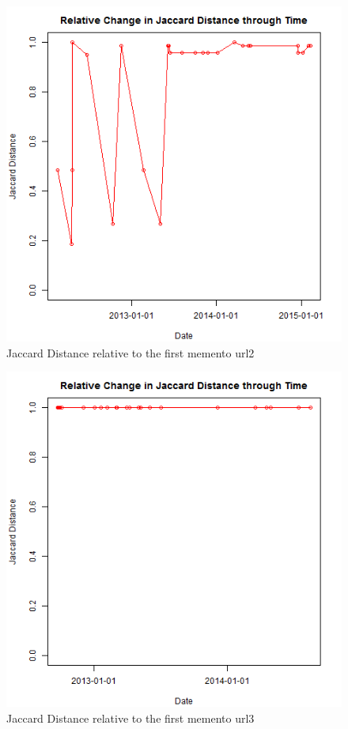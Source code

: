 \begin{figure}[ht]
	\begin{center}
		 \includegraphics[scale=0.60]{url2}
		  \caption{Jaccard Distance relative to the first memento url2}
	 \end{center}
\end{figure}
\begin{figure}[ht]
	\begin{center}
		 \includegraphics[scale=0.60]{url3}
		  \caption{Jaccard Distance relative to the first memento url3}
	 \end{center}
\end{figure}
